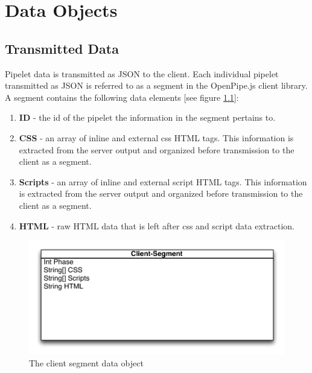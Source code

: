 \documentclass[12pt]{report}
\begin{document}
\chapter{Data Objects}

\section{Transmitted Data}

Pipelet data is transmitted as JSON to the client. Each individual pipelet transmitted as JSON is referred to as a segment in the OpenPipe.js client library. A segment contains the following data elements [see figure \ref{fig:clientSegmentDataObject}]:

\begin{enumerate}
\item \textbf{ID} - the id of the pipelet the information in the segment pertains to. 
\item \textbf{CSS} - an array of inline and external css HTML tags. This information is extracted from the server output and organized before transmission to the client as a segment.
\item \textbf{Scripts} - an array of inline and external script HTML tags. This information is extracted from the server output and organized before transmission to the client as a segment.
\item \textbf{HTML} - raw HTML data that is left after css and script data extraction.
\end{enumerate}

\begin{figure}[H]
\caption{The client segment data object}
\label{fig:clientSegmentDataObject}
\centering
\includegraphics[width=\textwidth,keepaspectratio]{figures/images/client_segment_data_object.pdf}
\end{figure}
\end{document}
